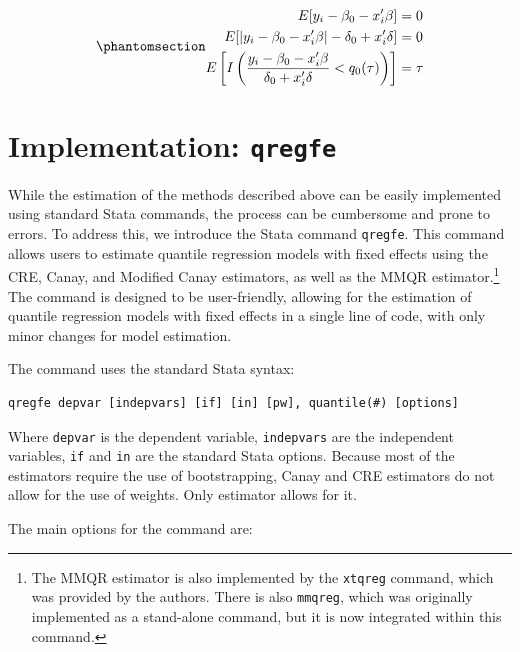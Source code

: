 \documentclass[bib]{statapress}
\begin{document}
\begin{equation}\phantomsection\label{eq-mmqreg-moments}{\begin{aligned}
E[y_{i} - \beta_0 - x_{i}' \beta] &= 0 \\
E[|y_{i} - \beta_0 - x_{i}' \beta|- \delta_0 + x_{i}' \delta] &= 0 \\
E\left[ I\left(\frac{y_{i} - \beta_0 - x_{i}' \beta}{\delta_0 + x_{i}' \delta} < q_0(\tau)\right) \right] &= \tau
\end{aligned}
}\end{equation}

\section{\texorpdfstring{Implementation:
\texttt{qregfe}}{Implementation: qregfe}}\label{sec-implementation}

While the estimation of the methods described above can be easily
implemented using standard Stata commands, the process can be cumbersome
and prone to errors. To address this, we introduce the Stata command
\texttt{qregfe}. This command allows users to estimate quantile
regression models with fixed effects using the CRE, Canay, and Modified
Canay estimators, as well as the MMQR estimator.\footnote{The MMQR
  estimator is also implemented by the \texttt{xtqreg} command, which
  was provided by the authors. There is also \texttt{mmqreg}, which was
  originally implemented as a stand-alone command, but it is now
  integrated within this command.} The command is designed to be
user-friendly, allowing for the estimation of quantile regression models
with fixed effects in a single line of code, with only minor changes for
model estimation.

The command uses the standard Stata syntax:

\begin{verbatim}
qregfe depvar [indepvars] [if] [in] [pw], quantile(#) [options]
\end{verbatim}

Where \texttt{depvar} is the dependent variable, \texttt{indepvars} are
the independent variables, \texttt{if} and \texttt{in} are the standard
Stata options. Because most of the estimators require the use of
bootstrapping, Canay and CRE estimators do not allow for the use of
weights. Only \citet{mss2019} estimator allows for it.

The main options for the command are:
\end{document}

